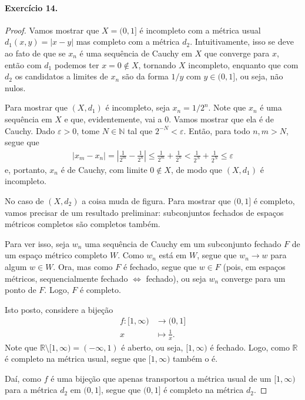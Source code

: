 \documentclass[12pt,a4paper]{article}
\begin{document}
\paragraph{Exercício 14.}
\begin{proof}
Vamos mostrar que $X = (0,1]$ é incompleto com a métrica usual $d_1(x,y) = |x-y|$ mas completo com a métrica $d_2$. Intuitivamente,
isso se deve ao fato de que se $x_n$ é uma sequência de Cauchy em $X$ que converge para $x$, então com $d_1$ podemos ter
$x=0\notin X$, tornando $X$ incompleto, enquanto que com $d_2$ os candidatos a limites de $x_n$ são da forma $1/y$ com $y\in (0,1]$, ou seja, não nulos.

Para mostrar que $(X, d_1)$ é incompleto, seja $x_n = 1/2^n$. Note que $x_n$ é uma sequência em $X$ e que, evidentemente, vai 
a $0$. Vamos mostrar que ela é de Cauchy. Dado $\varepsilon > 0$, tome $N\in\mathbb{N}$ tal que $2^{-N} < \varepsilon$. Então, para todo $n,m > N$, segue que
\begin{align*}
    |x_m - x_n| = \left| \frac{1}{2^m} - \frac{1}{2^n} \right| \leq \frac{1}{2^m} + \frac{1}{2^n} < \frac{1}{2^N} + \frac{1}{2^N} 
    \leq \varepsilon
\end{align*}
e, portanto, $x_n$ é de Cauchy, com limite $0\notin X$, de modo que $(X, d_1)$ é incompleto.

No caso de $(X, d_2)$ a coisa muda de figura. Para mostrar que $(0,1]$ é completo, vamos precisar de um resultado preliminar:
subconjuntos fechados de espaços métricos completos são completos também.

Para ver isso, seja $w_n$ uma sequência de Cauchy em um subconjunto fechado $F$ de um espaço métrico completo $W$. 
Como $w_n$ está em $W$, segue que $w_n \to w$ para algum $w\in W$. Ora, mas como $F$ é fechado, segue que $w\in F$
(pois, em espaços métricos, sequencialmente fechado $\iff$ fechado), ou seja $w_n$ converge para um ponto de $F$. 
Logo, $F$ é completo.

Isto posto, considere a bijeção
\begin{align*}
    f: [1, \infty) &\to (0,1]
    \\
    x&\mapsto \frac{1}{x}.
\end{align*}
Note que $\mathbb{R}\setminus [1, \infty) = (-\infty, 1)$ é aberto, ou seja, $[1, \infty)$ é fechado. Logo, como
$\mathbb{R}$ é completo na métrica usual, segue que $[1, \infty)$ também o é.

Daí, como $f$ é uma bijeção que apenas transportou a métrica usual de um $[1, \infty)$
para a métrica $d_2$ em $(0,1]$, segue que $(0,1]$ é completo na métrica $d_2$.
\end{proof}
\end{document}

